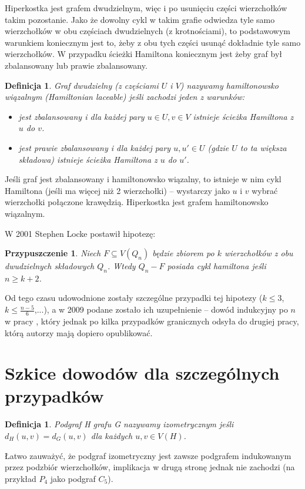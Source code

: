 \documentclass{pracamgr}
\newtheorem{defi}[theorem]{Definicja}
\newtheorem{conjecture}[theorem]{Przypuszczenie}
\begin{document}
   Hiperkostka jest grafem dwudzielnym, więc i po usunięciu części wierzchołków takim pozostanie.
   Jako że dowolny cykl w takim grafie odwiedza tyle samo wierzchołków w obu częściach dwudzielnych (z krotnościami),
   to podstawowym warunkiem koniecznym jest to, żeby z obu tych części usunąć dokładnie tyle samo wierzchołków.
   W przypadku ścieżki Hamiltona koniecznym jest żeby graf był zbalansowany lub prawie zbalansowany.
   
   \begin{defi}\label{Hamiltonian lacable}
    Graf dwudzielny (z częściami $U$ i $V$) nazywamy hamiltonowsko wiązalnym (Hamiltonian laceable) jeśli zachodzi jeden z warunków:
    \begin{itemize}
     \item jest zbalansowany i dla każdej pary $u\in U,v\in V$ istnieje ścieżka Hamiltona z $u$ do $v$.
     \item jest prawie zbalansowany i dla każdej pary $u,u'\in U$ (gdzie $U$ to ta większa składowa) istnieje ścieżka Hamiltona
      z $u$ do $u'$.
    \end{itemize}
   \end{defi}
   \noindent
   Jeśli graf jest zbalansowany i hamiltonowsko wiązalny, to istnieje w nim cykl Hamiltona (jeśli ma więcej niż 2 wierzchołki) -- wystarczy jako $u$ i $v$ wybrać
   wierzchołki połączone krawędzią.\newline
   Hiperkostka jest grafem hamiltonowsko wiązalnym.\newline

   W 2001 Stephen Locke postawił hipotezę:
   \begin{conjecture}\label{Locke conjecture}
    Niech $F\subseteq V(Q_n)$ będzie zbiorem po $k$ wierzchołków z obu dwudzielnych składowych $Q_n$. Wtedy $Q_n-F$ posiada cykl hamiltona jeśli
    $n\ge k+2$.
   \end{conjecture}
   Od tego czasu udowodnione zostały szczególne przypadki tej hipotezy ($k\le3$, $k\le\frac{n-5}{6}$,...),
   a w 2009 podane zostało ich uzupełnienie -- dowód indukcyjny po $n$ w pracy \cite{Locke}, który jednak po kilka przypadków granicznych odsyła
   do drugiej pracy, którą autorzy mają dopiero opublikować.
   
  \section{Szkice dowodów dla szczególnych przypadków}
   \begin{defi}\label{podgraf izometryczny}
    Podgraf H grafu G nazywamy \emph{izometrycznym} jeśli $d_H(u,v)=d_G(u,v)$ dla każdych $u,v\in V(H)$.
   \end{defi}
   Łatwo zauważyć, że podgraf izometryczny jest zawsze podgrafem indukowanym przez podzbiór wierzchołków,
   implikacja w drugą stronę jednak nie zachodzi (na przykład $P_4$ jako podgraf $C_5$).
\end{document}
